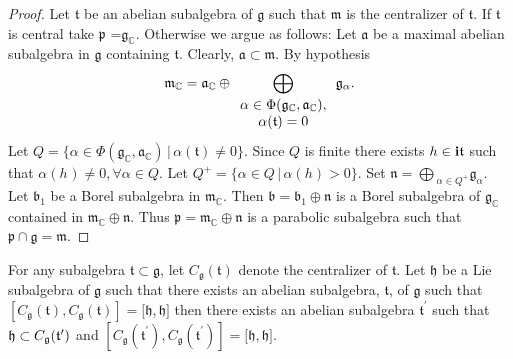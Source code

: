 \documentclass{amse-new}
\numberwithin{equation}{section} %
\begin{document}
\begin{proof}
Let $\mathfrak{t}$ be an abelian subalgebra of $\mathfrak{g}$ such that
$\mathfrak{m}$ is the centralizer of $\mathfrak{t}$. If $\mathfrak{t}$ is central take $\mathfrak{p}$ =$\mathfrak{g}_{\mathbb{C}}$.
Otherwise we argue as follows:
 Let $\mathfrak{a}$ be a
maximal abelian subalgebra in $\mathfrak{g}$ containing $\mathfrak{t}$. Clearly,
$\mathfrak{a}\subset\mathfrak{m}$. By hypothesis
\[
\mathfrak{m}_{\mathbb{C}}=\mathfrak{a}_{\mathbb{C}}\oplus\bigoplus_{%
\begin{array}
[c]{c}%
\alpha\in\Phi(\mathfrak{g}_{\mathbb{C}},\mathfrak{a}_{\mathbb{C}}),\\
\alpha(\mathfrak{t})=0
\end{array}
}\mathfrak{g}_{\alpha}.
\]
Let $Q=\{\alpha\in\Phi(\mathfrak{g}_{\mathbb{C}},\mathfrak{a}_{\mathbb{C}})\,
|\, \alpha(\mathfrak{t})\neq0\}$. Since $Q$ is finite there exists $h\in
{\bf{i}}\mathfrak{t}$ such that $\alpha(h_{{}})\neq0, \forall \alpha\in Q$. Let $Q^{+}%
=\{\alpha\in Q\, |\, \alpha(h)>0\}.$ Set $\mathfrak{n=\bigoplus}_{\alpha\in
Q^{+}}\mathfrak{g}_{\alpha}$. Let $\mathfrak{b}_{1}$ be a Borel subalgebra in
$\mathfrak{m}_{\mathbb{C}}$. Then $\mathfrak{b}=\mathfrak{b}_{1}%
\oplus\mathfrak{n}$ is a Borel subalgebra of $\mathfrak{g}_{\mathbb{C}}$
contained in $\mathfrak{m}_{\mathbb{C}}\oplus\mathfrak{n}$. Thus
$\mathfrak{p}=\mathfrak{m}_{\mathbb{C}}\oplus\mathfrak{n}$ is a parabolic
subalgebra such that $\mathfrak{p}\cap\mathfrak{g=\mathfrak{m}}$.
\end{proof}
\begin{lemma}\label{lemma:HK} For any subalgebra $\mathfrak{t}\subset \mathfrak{g}$, let $C_{\mathfrak{g}}(\mathfrak{t})$ denote the centralizer of $\mathfrak{t}$.
Let $\mathfrak{h}$ be a Lie subalgebra of $\mathfrak{g}$ such that there
exists an abelian subalgebra, $\mathfrak{t}$, of $\mathfrak{g}$ such that $%
\left[ C_{\mathfrak{g}}(\mathfrak{t}),C_{\mathfrak{g}}(\mathfrak{t})\right] =%
\mathfrak{[\mathfrak{h}},\mathfrak{h}]$ then there exists an abelian subalgebra $\mathfrak{t}%
^{\prime }$  such that $\mathfrak{h}\subset C_{%
\mathfrak{g}}(\mathfrak{t}^{\prime })$ and $\left[ C_{\mathfrak{g}}(%
\mathfrak{t}^{\prime }),C_{\mathfrak{g}}(\mathfrak{t}^{\prime })\right] =%
\mathfrak{[\mathfrak{h}},\mathfrak{h}]$.
\end{lemma}
\end{document}
